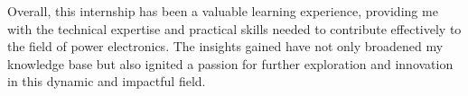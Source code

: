 \noindent
Overall, this internship has been a valuable learning experience, providing me
with the technical expertise and practical skills needed to contribute
effectively to the field of power electronics. The insights gained have not only
broadened my knowledge base but also ignited a passion for further exploration
and innovation in this dynamic and impactful field.